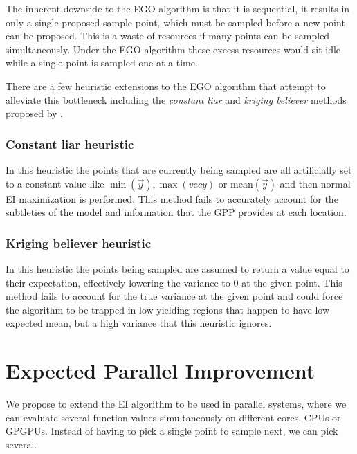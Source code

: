 \documentclass[phd,tocprelim]{cornell}
\begin{document}
The inherent downside to the EGO algorithm is that it is sequential, it results in only a single proposed sample point, which must be sampled before a new point can be proposed. This is a waste of resources if many points can be sampled simultaneously. Under the EGO algorithm these excess resources would sit idle while a single point is sampled one at a time.

There are a few heuristic extensions to the EGO algorithm that attempt to alleviate this bottleneck including the {\it constant liar} and {\it kriging believer} methods proposed by \cite{Ginsbourger2008}.

\subsubsection{Constant liar heuristic}

In this heuristic the points that are currently being sampled are all artificially set to a constant value like $\min(\vec{y}), \max(vec{y})$ or mean$(\vec{y})$ and then normal EI maximization is performed. This method fails to accurately account for the subtleties of the model and information that the GPP provides at each location.

\subsubsection{Kriging believer heuristic}

In this heuristic the points being sampled are assumed to return a value equal to their expectation, effectively lowering the variance to 0 at the given point. This method fails to account for the true variance at the given point and could force the algorithm to be trapped in low yielding regions that happen to have low expected mean, but a high variance that this heuristic ignores.

\section{Expected Parallel Improvement}

We propose to extend the EI algorithm to be used in parallel systems, where we can evaluate several function values simultaneously on different cores, CPUs or GPGPUs. Instead of having to pick a single point to sample next, we can pick several.
\end{document}
